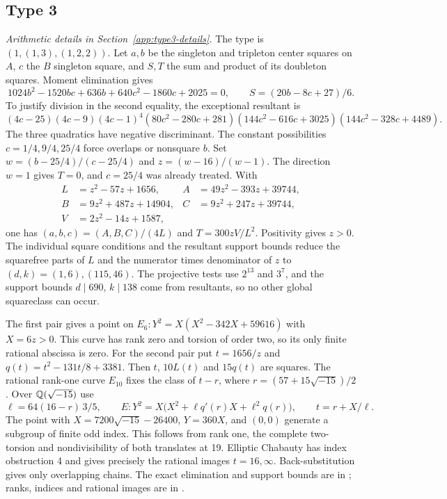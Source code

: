 \subsection{Type 3}\label{app:type3}
\noindent\emph{Arithmetic details in Section~\ref{app:type3-details}.}\enspace
The type is $(1,(1,3),(1,2,2))$. Let $a,b$ be the singleton and
tripleton center squares on $A$, $c$ the $B$ singleton square, and
$S,T$ the sum and product of its doubleton squares. Moment elimination gives
\[
 1024b^2-1520bc+636b+640c^2-1860c+2025=0,
 \qquad S=(20b-8c+27)/6.
\]
To justify division in the second equality, the exceptional resultant is
\[
 (4c-25)(4c-9)(4c-1)^4
 (80c^2-280c+281)(144c^2-616c+3025)(144c^2-328c+4489).
\]
The three quadratics have negative discriminant. The constant possibilities
$c=1/4,9/4,25/4$ force overlaps or nonsquare $b$.
Set $w=(b-25/4)/(c-25/4)$ and $z=(w-16)/(w-1)$.
The direction $w=1$ gives $T=0$, and $c=25/4$ was already treated.
With
\[
\begin{aligned}
 L&=z^2-57z+1656,& A&=49z^2-393z+39744,\\
 B&=9z^2+487z+14904,& C&=9z^2+247z+39744,\\
 V&=2z^2-14z+1587,
\end{aligned}
\]
one has $(a,b,c)=(A,B,C)/(4L)$ and $T=300zV/L^2$.
Positivity gives $z>0$. The individual square conditions and the
resultant support bounds reduce the squarefree parts of $L$ and the
numerator times denominator of $z$ to
$(d,k)=(1,6),(115,46)$. The projective tests use $2^{13}$ and $3^7$,
and the support bounds $d\mid690$, $k\mid138$ come from resultants,
so no other global squareclass can occur.

The first pair gives a point on
$E_6:Y^2=X(X^2-342X+59616)$ with $X=6z>0$.
This curve has rank zero and torsion of order two, so its only finite
rational abscissa is zero. For the second pair put $t=1656/z$ and
$q(t)=t^2-131t/8+3381$. Then $t$, $10L(t)$ and $15q(t)$ are squares.
The rational rank-one curve $E_{10}$ fixes the class of $t-r$, where
$r=(57+15\sqrt{-15})/2$. Over $\mathbb Q(\sqrt{-15})$ use
\[
 \ell=64(16-r)\,3/5,\qquad
 E:Y^2=X\bigl(X^2+\ell q'(r)X+\ell^2q(r)\bigr),\qquad t=r+X/\ell.
\]
The point with $X=7200\sqrt{-15}-26400$, $Y=360X$, and $(0,0)$
generate a subgroup of finite odd index. This follows from rank one,
the complete two-torsion and nondivisibility of both translates at 19.
Elliptic Chabauty has index obstruction 4 and gives precisely the rational
images $t=16,\infty$. Back-substitution gives only overlapping chains.
The exact elimination and support bounds are in
; ranks, indices and rational images are in
.

